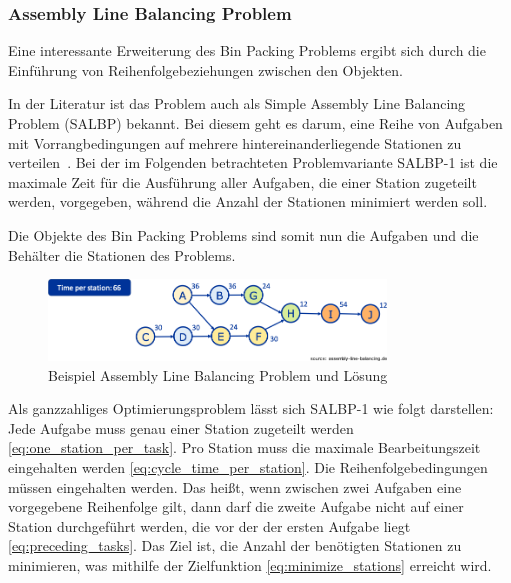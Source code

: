 \subsubsection{Assembly Line Balancing Problem}\label{subsubsec:assembly-line-balancing-problem}

Eine interessante Erweiterung des Bin Packing Problems ergibt sich durch die Einführung
von Reihenfolgebeziehungen zwischen den Objekten.

In der Literatur ist das Problem auch als Simple Assembly Line Balancing Problem (SALBP) bekannt.
Bei diesem geht es darum, eine Reihe von Aufgaben mit Vorrangbedingungen auf mehrere hintereinanderliegende
Stationen zu verteilen~\cite{alb_paper_50}.
Bei der im Folgenden betrachteten Problemvariante SALBP-1 ist die maximale Zeit für die Ausführung aller Aufgaben,
die einer Station zugeteilt werden, vorgegeben, während die Anzahl der Stationen minimiert werden soll.

Die Objekte des Bin Packing Problems sind somit nun die Aufgaben und die Behälter die Stationen des Problems.
\begin{figure}[h]
    \centering
    \includegraphics[width=0.8\textwidth]{images/math_problems/alb_example}
    \caption{Beispiel Assembly Line Balancing Problem und Lösung}
    \label{fig:alb_example}
\end{figure}

Als ganzzahliges Optimierungsproblem lässt sich SALBP-1 wie folgt darstellen:
Jede Aufgabe muss genau einer Station zugeteilt werden \eqref{eq:one_station_per_task}.
Pro Station muss die maximale Bearbeitungszeit eingehalten werden \eqref{eq:cycle_time_per_station}.
Die Reihenfolgebedingungen müssen eingehalten werden.
Das heißt, wenn zwischen zwei Aufgaben eine vorgegebene Reihenfolge gilt,
dann darf die zweite Aufgabe nicht auf einer Station durchgeführt werden,
die vor der der ersten Aufgabe liegt \eqref{eq:preceding_tasks}.
Das Ziel ist, die Anzahl der benötigten Stationen zu minimieren,
was mithilfe der Zielfunktion \eqref{eq:minimize_stations} erreicht wird.

